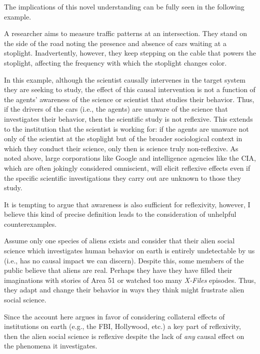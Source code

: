 The implications of this novel understanding can be fully seen in the following example.

\begin{example}
A researcher aims to measure traffic patterns at an intersection. They stand on the side of the road noting the presence and absence of cars waiting at a stoplight. Inadvertently, however, they keep stepping on the cable that powers the stoplight, affecting the frequency with which the stoplight changes color.
\end{example}

\noindent In this example, although the scientist causally intervenes in the target system they are seeking to study, the effect of this causal intervention is not a function of the agents' awareness of the science or scientist that studies their behavior. Thus, if the drivers of the cars (i.e., the agents) are unaware of the science that investigates their behavior, then the scientific study is not reflexive. This extends to the institution that the scientist is working for: if the agents are unaware not only of the scientist at the stoplight but of the broader sociological context in which they conduct their science, only then is science truly non-reflexive. As noted above, large corporations like Google and intelligence agencies like the CIA, which are often jokingly considered omniscient, will elicit reflexive effects even if the specific scientific investigations they carry out are unknown to those they study.

It is tempting to argue that awareness is also sufficient for reflexivity, however, I believe this kind of precise definition leads to the consideration of unhelpful counterexamples.

\begin{example}\label{ex_aliens}
Assume only one species of aliens exists and consider that their alien social science which investigates human behavior on earth is entirely undetectable by us (i.e., has no causal impact we can discern). Despite this, some members of the public believe that aliens are real. Perhaps they have they have filled their imaginations with stories of Area 51 or watched too many \textit{X-Files} episodes. Thus, they adapt and change their behavior in ways they think might frustrate alien social science.
\end{example}

\noindent Since the account here argues in favor of considering collateral effects of institutions on earth (e.g., the FBI, Hollywood, etc.) a key part of reflexivity, then the alien social science is reflexive despite the lack of \textit{any} causal effect on the phenomena it investigates.

